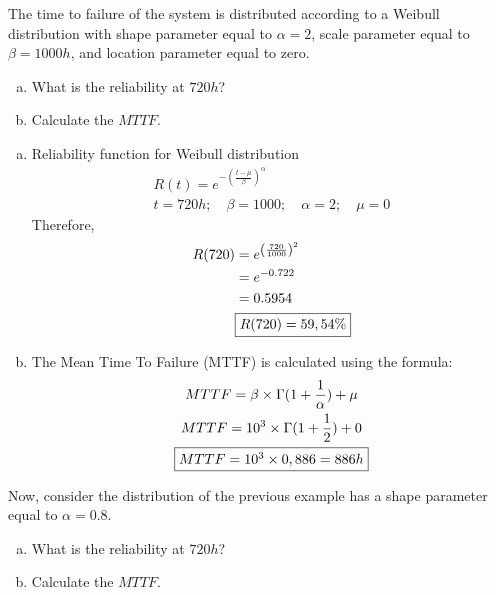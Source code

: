 \documentclass{article}
\begin{document}
\begin{question}
	The time to failure of the system is distributed according to a Weibull distribution with shape parameter equal to \( \alpha = 2 \), scale parameter equal to \( \beta = 1000h \), and location parameter equal to zero.
\begin{enumerate}[(a)]
    \item What is the reliability at \( 720h \)?
    \item Calculate the \( MTTF \).
	\end{enumerate}
\end{question}

\begin{enumerate}[(a)]
    \item Reliability function for Weibull distribution
\begin{gather*}
    R(t) = e^{-\left(\frac{t-\mu}{\beta}\right)^\alpha} \\
    t = 720h; \quad \beta = 1000; \quad \alpha = 2; \quad \mu = 0
\end{gather*}
Therefore,
\begin{align*}
    R(720) &= e^{\left(\frac{720}{1000}\right)^2} \\
    &= e^{-0.722} \\
    &= 0.5954 \\
    &\fbox{$R(720) = 59,54\%$}
\end{align*}

    \item The Mean Time To Failure (MTTF) is calculated using the formula: 
\begin{gather*}
    MTTF = \beta \times \Gamma(1 + \frac{1}{\alpha}) + \mu \\
    MTTF = 10^3 \times \Gamma( 1 + \frac{1}{2}) + 0 \\
    \fbox{$MTTF = 10^3 \times 0,886 = 886 h$}
\end{gather*}
\end{enumerate}

\begin{question}
	Now, consider the distribution of the previous example has a shape parameter equal to \( \alpha = 0.8 \).
    \begin{enumerate}[(a)] 
    \item What is the reliability at \( 720h \)?
    \item Calculate the \( MTTF \).
	\end{enumerate}
\end{question}
\end{document}
